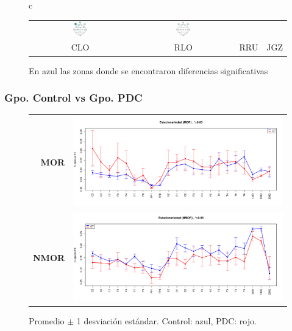 \documentclass{beamer}
\begin{document}
\begin{frame}
\begin{figure}
\begin{tabular}{c}
\begin{tabular}{cccc}
\includegraphics[width=0.15\textwidth]{./cabecitas/cabecita_RRU.pdf} &
\includegraphics[width=0.15\textwidth]{./cabecitas/cabecita_JGZ.pdf} \\
CLO & RLO & RRU & JGZ
\end{tabular}
\end{tabular}
\caption{En azul las zonas donde se encontraron diferencias significativas}
\end{figure}
\end{frame}


\begin{frame}\frametitle{Gpo. Control vs Gpo. PDC}
\begin{figure}
\centering
\begin{tabular}{rl}
{\Large \textbf{MOR}}
&
\includegraphics[width=0.6\linewidth]
{./new170424/Comparacion_gpos_MOR.pdf} 
\\
{\Large \textbf{NMOR}}
&
\includegraphics[width=0.6\linewidth]
{./new170424/Comparacion_gpos_NMOR.pdf} 
\end{tabular}
\caption{ Promedio $\pm$ 1 desviaci\'on est\'andar. Control: azul, PDC: rojo.}
\end{figure}
\end{frame}
\end{document}
